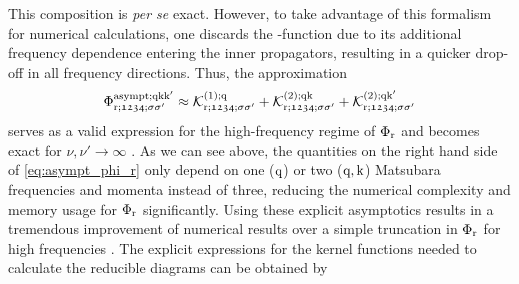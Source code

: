 \documentclass[../../main.tex]{subfiles}
\begin{document}
This composition is \textit{per se} exact. However, to take advantage of this formalism for numerical calculations, one discards the -function due to its additional frequency dependence entering the inner propagators, resulting in a quicker drop-off in all frequency directions. Thus, the approximation
\begin{align}\label{eq:asympt_phi_r}
	\Phi_{\text{r};\mathfrak{1234};\sigma\sigma'}^{\text{asympt};\text{q}\text{k}\text{k}'}\approx\mathcal{K}^{(1);\text{q}}_{\text{r};\mathfrak{1234};\sigma\sigma'}+\mathcal{K}^{(2);\text{q}\text{k}}_{\text{r};\mathfrak{1234};\sigma\sigma'}+\mathcal{K}^{(2);\text{q}\text{k}'}_{\text{r};\mathfrak{1234};\sigma\sigma'}
\end{align}
serves as a valid expression for the high-frequency regime of $\Phi_{\text{r}}$ and becomes exact for $\nu,\nu'\to\infty$ \cite{high-freq asympt}. As we can see above, the quantities on the right hand side of \eqref{eq:asympt_phi_r} only depend on one ($\text{q}$) or two ($\text{q},\text{k}$) Matsubara frequencies and momenta instead of three, reducing the numerical complexity and memory usage for $\Phi_{\text{r}}$ significantly. Using these explicit asymptotics results in a tremendous improvement of numerical results over a simple truncation in $\Phi_{\text{r}}$ for high frequencies \cite{high-freq asympt}. The explicit expressions for the kernel functions needed to calculate the reducible diagrams can be obtained by \cite{towards ab initio dga, josef DA, pudleiner paper}
\end{document}
